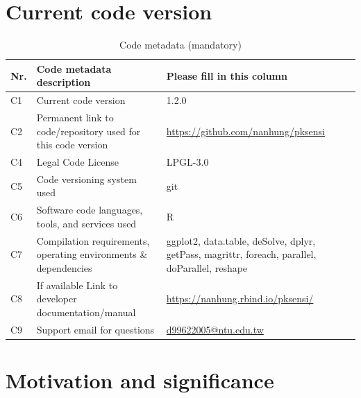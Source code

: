 \documentclass[preprint,12pt, a4paper]{elsarticle}
\begin{document}
\section*{Current code version}

\begin{table}[H]
\begin{tabular}{|l|p{6.5cm}|p{6.5cm}|}
\hline
\textbf{Nr.} & \textbf{Code metadata description} & \textbf{Please fill in this column} \\
\hline
C1 & Current code version & 1.2.0 \\
\hline
C2 & Permanent link to code/repository used for this code version & \url{https://github.com/nanhung/pksensi} \\
\hline
C4 & Legal Code License & LPGL-3.0 \\
\hline
C5 & Code versioning system used & git \\
\hline
C6 & Software code languages, tools, and services used & R \\
\hline
C7 & Compilation requirements, operating environments \& dependencies & ggplot2, data.table, deSolve, dplyr, getPass, magrittr, foreach, parallel, doParallel, reshape \\
\hline
C8 & If available Link to developer documentation/manual & \url{https://nanhung.rbind.io/pksensi/} \\
\hline
C9 & Support email for questions & \url{d99622005@ntu.edu.tw} \\
\hline
\end{tabular}
\caption{Code metadata (mandatory)}
\label{} 
\end{table}


\linenumbers


\newpage

\section{Motivation and significance}
\end{document}
